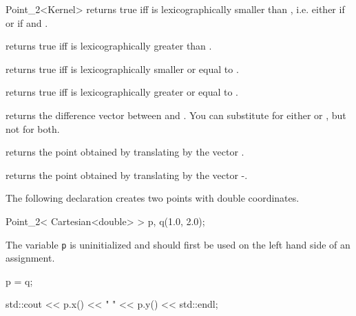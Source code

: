 \begin{ccRefClass} {Point_2<Kernel>}
       {returns true iff  is lexicographically smaller than ,
       i.e. either if  or if  and
       .}

       {returns true iff  is lexicographically greater than .}

       {returns true iff  is lexicographically smaller or equal to .}

       {returns true iff  is lexicographically greater or equal to .}

       {returns the difference vector between  and . 
        You can substitute  for either  or ,
        but not for both.}

       {returns the point obtained by translating  by the 
        vector .}

       {returns the point obtained by translating  by the 
        vector -.}

\ccExample

The following declaration creates two points with
 double coordinates.

\begin{cprog}

  Point_2< Cartesian<double> > p, q(1.0, 2.0);
\end{cprog} 

The variable {\tt p} is uninitialized and should first be used on 
the left hand side of an assignment. 
\begin{cprog}

  p = q;

  std::cout << p.x() << "  " << p.y() << std::endl; 
\end{cprog} 


\ccSeeAlso
{}

\end{ccRefClass} 
